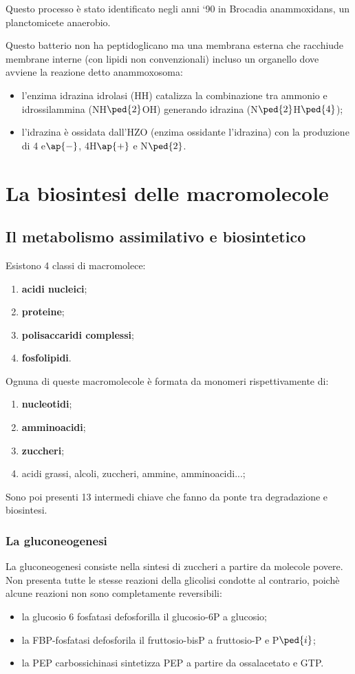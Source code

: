 \documentclass[11pt]{book}
\begin{document}
Questo processo è stato identificato negli anni ‘90 in Brocadia anammoxidans, un planctomicete anaerobio.

Questo batterio non ha peptidoglicano ma una membrana esterna che racchiude membrane interne (con lipidi non convenzionali) incluso un organello dove avviene la reazione detto anammoxosoma:
\begin{itemize}
\item l’enzima idrazina idrolasi (HH) catalizza la combinazione tra ammonio e idrossilammina (NH$\ped{2}$OH) generando idrazina (N$\ped{2}$H$\ped{4}$); 
\item l’idrazina è ossidata dall’HZO (enzima ossidante l’idrazina) con la produzione di 4 e$\ap{-}$, 4H$\ap{+}$ e N$\ped{2}$.
\end{itemize}

\chapter{La biosintesi delle macromolecole}
\section{Il metabolismo assimilativo e biosintetico}

Esistono 4 classi di macromolece:
\begin{enumerate}
\item \textbf{acidi nucleici};
\item \textbf{proteine};
\item \textbf{polisaccaridi complessi};
\item \textbf{fosfolipidi}.
\end{enumerate}

Ognuna di queste macromolecole è formata da monomeri rispettivamente di:
\begin{enumerate}
\item \textbf{nucleotidi};
\item \textbf{amminoacidi};
\item \textbf{zuccheri};
\item acidi grassi, alcoli, zuccheri, ammine, amminoacidi...;
\end{enumerate}

Sono poi presenti 13 intermedi chiave che fanno da ponte tra degradazione e biosintesi.


\subsection{La gluconeogenesi}
La gluconeogenesi consiste nella sintesi di zuccheri a partire da molecole povere. Non presenta tutte le stesse reazioni della glicolisi condotte al contrario, poichè alcune reazioni non sono completamente reversibili:
\begin{itemize}
\item la glucosio 6 fosfatasi defosforilla il glucosio-6P a glucosio;
\item la FBP-fosfatasi defosforila il fruttosio-bisP a fruttosio-P e P$\ped{i}$; \item la PEP carbossichinasi sintetizza PEP a partire da ossalacetato e GTP.
\end{itemize}
\end{document}
